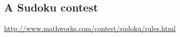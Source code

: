 \subsection{A Sudoku contest}
\label{sec:contest}

\url{http://www.mathworks.com/contest/sudoku/rules.html}

